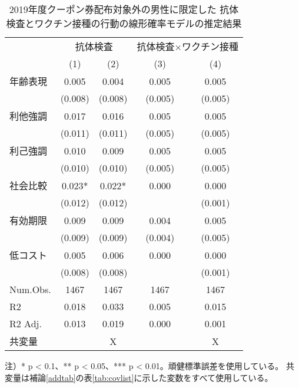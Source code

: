 \documentclass[
  11pt,
  a4paper,
]{article}
\begin{document}
\begin{table}

\caption{\label{tab:show-act-coupon0-reg}2019年度クーポン券配布対象外の男性に限定した 抗体検査とワクチン接種の行動の線形確率モデルの推定結果}
\centering
\begin{threeparttable}
\begin{tabular}[t]{lcccc}
\toprule
\multicolumn{1}{c}{ } & \multicolumn{2}{c}{抗体検査} & \multicolumn{2}{c}{抗体検査×ワクチン接種} \\
\cmidrule(l{3pt}r{3pt}){2-3} \cmidrule(l{3pt}r{3pt}){4-5}
  & (1) & (2) & (3) & (4)\\
\midrule
年齢表現 & 0.005 & 0.004 & 0.005 & 0.005\\
 & (0.008) & (0.008) & (0.005) & (0.005)\\
利他強調 & 0.017 & 0.016 & 0.005 & 0.005\\
 & (0.011) & (0.011) & (0.005) & (0.005)\\
利己強調 & 0.010 & 0.009 & 0.005 & 0.005\\
 & (0.010) & (0.010) & (0.005) & (0.005)\\
社会比較 & 0.023* & 0.022* & 0.000 & 0.000\\
 & (0.012) & (0.012) &  & (0.001)\\
有効期限 & 0.009 & 0.009 & 0.004 & 0.005\\
 & (0.009) & (0.009) & (0.004) & (0.005)\\
低コスト & 0.005 & 0.006 & 0.000 & 0.000\\
 & (0.008) & (0.008) &  & (0.001)\\
\midrule
Num.Obs. & 1467 & 1467 & 1467 & 1467\\
R2 & 0.018 & 0.033 & 0.005 & 0.015\\
R2 Adj. & 0.013 & 0.019 & 0.000 & 0.001\\
共変量 &  & X &  & X\\
\bottomrule
\end{tabular}
\begin{tablenotes}
\item 注）* p < 0.1、** p < 0.05、*** p < 0.01。頑健標準誤差を使用している。 共変量は補論\ref{addtab}の表\ref{tab:covlist}に示した変数をすべて使用している。
\end{tablenotes}
\end{threeparttable}
\end{table}
\end{document}
